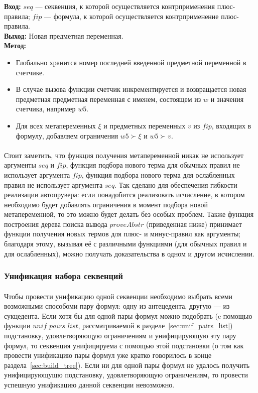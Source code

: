 \documentclass{cw1}
\begin{document}
\begin{description}
    \textbf{Вход: }  $seq$ --- секвенция, к которой осуществляется контрприменения плюс-правила;
    $fip$ --- формула, к которой осуществляется контрприменение плюс-правила.\\
    \textbf{Выход:} Новая предметная переменная.\\
    \textbf{Метод:}
    \begin{itemize}
    \item Глобально хранится номер последней введенной предметной переменной в счетчике.
    \item В случае вызова функции счетчик инкрементируется и возвращается новая предметная
    предметная переменная с именем, состоящем из $w$ и значения счетчика, например $w5$.
    \item Для всех метапеременных $\xi$ и предметных переменных $v$ из $fip$, входящих в формулу, добавляем
    ограничения $w5 \succ \xi$ и $w5 \succ v$.
    \end{itemize}
 \end{description}

\paragraph{}
Стоит заметить, что функция получения метапеременной никак не использует аргументы $seq$ и $fip$,
функция подбора нового терма для обычных правил не использует аргумента $fip$,
функция подбора нового терма для ослабленных правил не использует аргумента $seq$. Так сделано для обеспечения
гибкости реализации автопрувера: если понадобится реализовать исчисление, в котором необходимо будет добавлять
ограничения в момент подбора новой метапеременной, то это можно будет делать без особых проблем.
Также функция построения дерева поиска вывода $proveAbstr$ (приведенная ниже) принимает функции получения новых
термов для плюс- и минус-правил как аргументы; благодаря этому, вызывая её с различными функциями (для
обычных правил и для ослабленных), можно  получать доказательства в одном и другом исчислении.

\subsubsection{Унификация набора секвенций}
\label{sec:unif_seq_list}
\paragraph{}
Чтобы провести унификацию одной секвенции необходимо выбрать всеми возможными способоми пару формул:
одну из антецедента, другую --- из сукцедента. Если хотя бы для одной пары формул можно подобрать
(c помощью функции  $unif\!\!\_pairs\!\_list$, рассматриваемой в разделе~\ref{sec:unif_pairs_list})
подстановку, удовлетворяющую ограничениям и унифицирующую эту пару формул, то секвенция унифицируема
с помощью этой подстановки (о том как провести унификацию пары формул уже кратко говорилось в
конце раздела~\ref{sec:build_tree}). Если ни для одной пары формул не удалось получить унифицирующущю подстановку,
удовлетворяющую ограничениям, то провести успешную унификацию данной секвенции невозможно.
\end{document}
